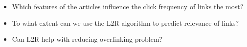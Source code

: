 \begin{itemize}
\item Which features of the articles influence the click frequency of links the most?
%
%
%
\item To what extent can we use the L2R algorithm to predict relevance of links?
\item Can L2R help with reducing overlinking problem?
%
%
\end{itemize}

